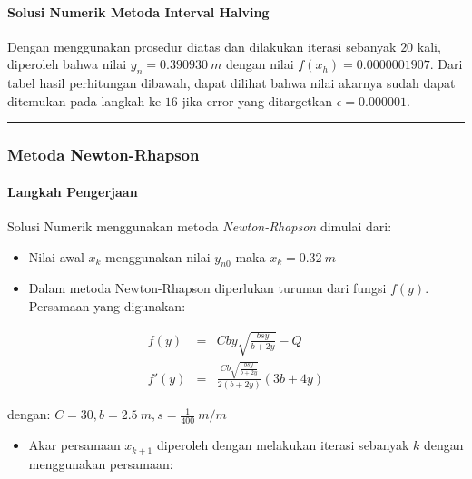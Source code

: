 \documentclass[11pt]{article}
\providecommand{\tightlist}{%
      \setlength{\itemsep}{0pt}\setlength{\parskip}{0pt}}
\begin{document}
    \paragraph{Solusi Numerik Metoda Interval
Halving}\label{solusi-numerik-metoda-interval-halving}

Dengan menggunakan prosedur diatas dan dilakukan iterasi sebanyak \(20\)
kali, diperoleh bahwa nilai \(y_n = 0.390930\ m\) dengan nilai
\(f(x_h) = 0.0000001907\). Dari tabel hasil perhitungan dibawah, dapat
dilihat bahwa nilai akarnya sudah dapat ditemukan pada langkah ke \(16\)
jika error yang ditargetkan \(\epsilon = 0.000001\).

    \begin{center}\rule{0.5\linewidth}{\linethickness}\end{center}

\subsubsection{Metoda Newton-Rhapson}\label{metoda-newton-rhapson}

\paragraph{Langkah Pengerjaan}\label{langkah-pengerjaan}

Solusi Numerik menggunakan metoda \emph{Newton-Rhapson} dimulai dari:

\begin{itemize}
\item
  Nilai awal \(x_k\) menggunakan nilai \(y_{n0}\) maka \(x_k = 0.32\ m\)
\item
  Dalam metoda Newton-Rhapson diperlukan turunan dari fungsi \(f(y)\).
  Persamaan yang digunakan:
\end{itemize}

\[\begin{aligned} f(y) &=& C b y \sqrt{\frac{b s y}{b + 2 y}} - Q \\
f'(y) &=& \frac{C b \sqrt{\frac{b s y}{b + 2 y}}}{2 \left(b + 2 y\right)} \left(3 b + 4 y\right) 
\end{aligned}\]

dengan: \(C = 30, b = 2.5\ m, s = \frac{1}{400}\ m/m\)

\begin{itemize}
\tightlist
\item
  Akar persamaan \(x_{k+1}\) diperoleh dengan melakukan iterasi sebanyak
  \(k\) dengan menggunakan persamaan:
\end{itemize}
\end{document}
